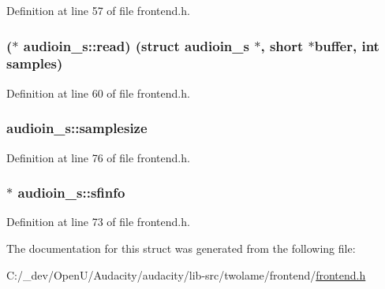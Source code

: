 Definition at line 57 of file frontend.\+h.

\subsubsection[{\texorpdfstring{read}{read}}]{($\ast$ audioin\+\_\+s\+::read) (struct {\bf audioin\+\_\+s} $\ast$, short $\ast${\bf buffer}, {\bf int} {\bf samples})}\hypertarget{structaudioin__s_aebab609975602745270208c70378fb18}{}\label{structaudioin__s_aebab609975602745270208c70378fb18}


Definition at line 60 of file frontend.\+h.

\subsubsection[{\texorpdfstring{samplesize}{samplesize}}]{ audioin\+\_\+s\+::samplesize}\hypertarget{structaudioin__s_a47ed9fcb24c3f7e390d0383d974fdef4}{}\label{structaudioin__s_a47ed9fcb24c3f7e390d0383d974fdef4}


Definition at line 76 of file frontend.\+h.

\subsubsection[{\texorpdfstring{sfinfo}{sfinfo}}]{$\ast$ audioin\+\_\+s\+::sfinfo}\hypertarget{structaudioin__s_af101968f364ce87662919aa7e1e63c78}{}\label{structaudioin__s_af101968f364ce87662919aa7e1e63c78}


Definition at line 73 of file frontend.\+h.



The documentation for this struct was generated from the following file\+:\begin{DoxyCompactItemize}
\item 
C\+:/\+\_\+dev/\+Open\+U/\+Audacity/audacity/lib-\/src/twolame/frontend/\hyperlink{frontend_8h}{frontend.\+h}\end{DoxyCompactItemize}
